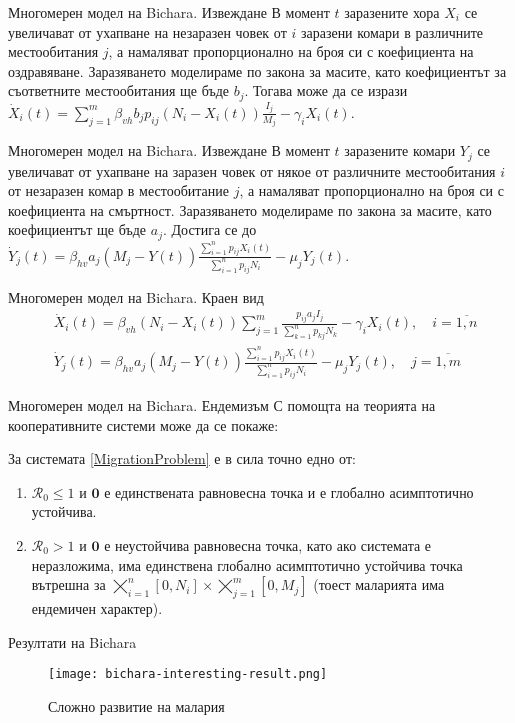 \begin{frame}[t]{Многомерен модел на Bichara. Извеждане}
  В момент $t$ заразените хора $X_i$ се увеличават от ухапване на незаразен човек от $i$ заразени комари в различните местообитания $j$, а намаляват пропорционално на броя си с коефициента на оздравяване. Заразяването моделираме по закона за масите, като коефициентът за съответните местообитания ще бъде $b_j$. Тогава може да се изрази $\dot{X}_i(t) = \sum_{j=1}^{m} \beta_{vh} b_j p_{ij} (N_i - X_i(t)) \frac{I_j}{M_j} - \gamma_i X_i(t)$.
\end{frame}

\begin{frame}[t]{Многомерен модел на Bichara. Извеждане}
  В момент $t$ заразените комари $Y_j$ се увеличават от ухапване на заразен човек от някое от различните местообитания $i$ от незаразен комар в местообитание $j$, а намаляват пропорционално на броя си с коефициента на смъртност. Заразяването моделираме по закона за масите, като коефициентът ще бъде $a_j$. Достига се до $\dot{Y}_j(t) = \beta_{hv} a_j (M_j - Y(t)) \frac{\sum_{i=1}^n p_{ij} X_i(t)}{\sum_{i=1}^n p_{ij} N_i} - \mu_j Y_j(t)$.
\end{frame}

\begin{frame}[t]{Многомерен модел на Bichara. Краен вид}
  \begin{equation}
    \label{eq:MigrationProblem}
    \begin{split}
      &\dot{X}_i(t) = \beta_{vh} (N_i - X_i(t)) \sum_{j=1}^{m} \frac{p_{ij} a_j I_j}{\sum_{k=1}^n p_{kj} N_k} - \gamma_i X_i(t), \quad i=\overline{1, n} \\
      &\dot{Y}_j(t) = \beta_{hv} a_j (M_j - Y(t)) \frac{\sum_{i=1}^n p_{ij} X_i(t)}{\sum_{i=1}^n p_{ij} N_i} - \mu_j Y_j(t), \quad j=\overline{1, m}
    \end{split}
  \end{equation}
\end{frame}

\begin{frame}[t]{Многомерен модел на Bichara. Ендемизъм}
  С помощта на теорията на кооперативните системи може да се покаже:
  \begin{proposition}
    За системата \ref{MigrationProblem} е в сила точно едно от:
    \begin{enumerate}
      \item $\mathscr{R}_0 \leq 1$ и $\boldsymbol{0}$ е единствената равновесна точка и е глобално асимптотично устойчива.
      \item $\mathscr{R}_0 > 1$ и $\boldsymbol{0}$ е неустойчива равновесна точка, като ако системата е неразложима, има единствена глобално асимптотично устойчива точка вътрешна за $\bigtimes_{i=1}^{n} [0, N_i] \times \bigtimes_{j=1}^{m} [0, M_j]$ (тоест маларията има ендемичен характер).
    \end{enumerate}
  \end{proposition}
\end{frame}

\begin{frame}[t]{Резултати на Bichara}
  \begin{figure}[h]
    \centering
    \texttt{[image: bichara-interesting-result.png]}
    \caption{Сложно развитие на малария}
  \end{figure}
\end{frame}
